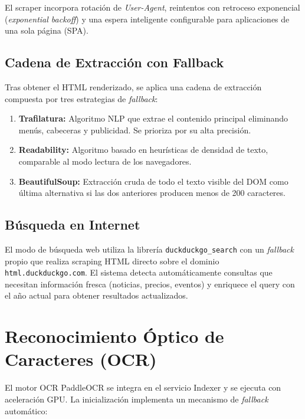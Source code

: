 El scraper incorpora rotación de \textit{User-Agent}, reintentos con retroceso exponencial (\textit{exponential backoff}) y una espera inteligente configurable para aplicaciones de una sola página (SPA).

\subsection{Cadena de Extracción con Fallback}

Tras obtener el HTML renderizado, se aplica una cadena de extracción compuesta por tres estrategias de \textit{fallback}:

\begin{enumerate}
    \item \textbf{Trafilatura:} Algoritmo NLP que extrae el contenido principal eliminando menús, cabeceras y publicidad. Se prioriza por su alta precisión.
    \item \textbf{Readability:} Algoritmo basado en heurísticas de densidad de texto, comparable al modo lectura de los navegadores.
    \item \textbf{BeautifulSoup:} Extracción cruda de todo el texto visible del DOM como última alternativa si las dos anteriores producen menos de 200 caracteres.
\end{enumerate}

\subsection{Búsqueda en Internet}

El modo de búsqueda web utiliza la librería \texttt{duckduckgo\_search} con un \textit{fallback} propio que realiza scraping HTML directo sobre el dominio \texttt{html.duckduckgo.com}. El sistema detecta automáticamente consultas que necesitan información fresca (noticias, precios, eventos) y enriquece el query con el año actual para obtener resultados actualizados.

\section{Reconocimiento Óptico de Caracteres (OCR)}
\label{sec:ocr-impl}

El motor OCR PaddleOCR se integra en el servicio Indexer y se ejecuta con aceleración GPU. La inicialización implementa un mecanismo de \textit{fallback} automático:


